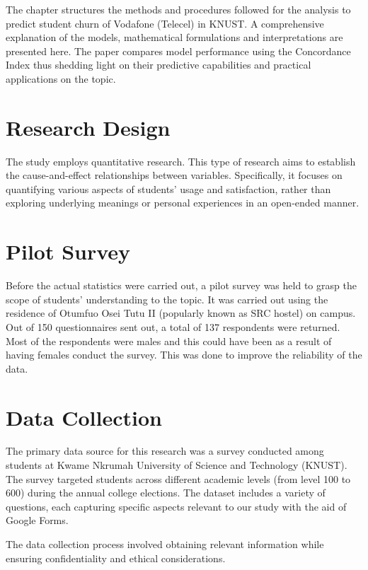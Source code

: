 \documentclass[doublespacing]{report} %
\begin{document}
The chapter structures the methods and procedures followed for the analysis to predict student churn of Vodafone (Telecel) in KNUST. A comprehensive explanation of the models, mathematical formulations and interpretations are presented here. The paper compares model performance using the Concordance Index thus shedding light on their predictive capabilities and practical applications on the topic.

\section{Research Design}

The study employs quantitative research. This type of research aims to establish the cause-and-effect relationships between variables. Specifically, it focuses on quantifying various aspects of students’ usage and satisfaction, rather than exploring underlying meanings or personal experiences in an open-ended manner.

\section{Pilot Survey}

Before the actual statistics were carried out, a pilot survey was held to grasp the scope of students’ understanding to the topic. It was carried out using the residence of Otumfuo Osei Tutu II (popularly known as SRC hostel) on campus. Out of 150 questionnaires sent out, a total of 137 respondents were returned. Most of the respondents were males and this could have been as a result of having females conduct the survey. This was done to improve the reliability of the data.

\section{Data Collection}

The primary data source for this research was a survey conducted among students at Kwame Nkrumah University of Science and Technology (KNUST). The survey targeted students across different academic levels (from level 100 to 600) during the annual college elections. The dataset includes a variety of questions, each capturing specific aspects relevant to our study with the aid of Google Forms.

The data collection process involved obtaining relevant information while ensuring confidentiality and ethical considerations.
\end{document}
